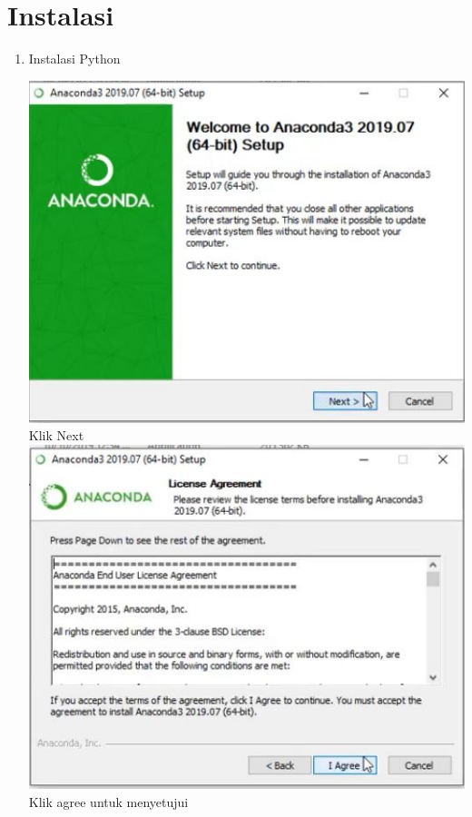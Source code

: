 \section{Instalasi}
\begin{enumerate}

\item Instalasi Python

\includegraphics{gambar/1_1.jpg}
Klik Next\\

\includegraphics{gambar/1_2.jpg}
Klik agree untuk menyetujui\\


\end{enumerate}
